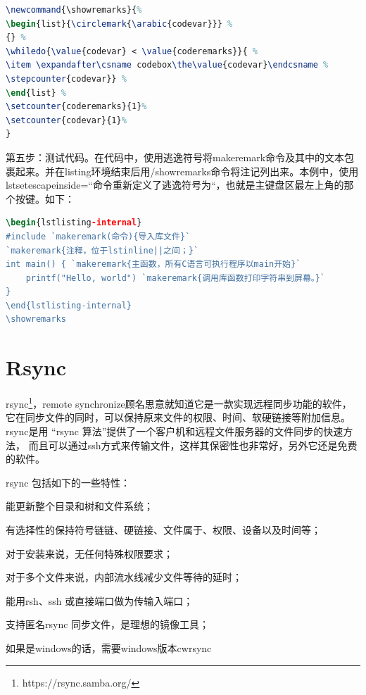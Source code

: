 \documentclass{book}
\newcounter{coderemarks}   %
\newcounter{codevar}     %
\newcommand{\circlemark}[1]{%
\tikz\node[text=white,font=\sffamily\bfseries,inner sep=0.2mm,draw,circle,fill=black]{#1};}
\newcommand{\showremarks}{%
\begin{list}{\circlemark{\arabic{codevar}}} %
{} %
\whiledo{\value{codevar} < \value{coderemarks}}{ %
\item \expandafter\csname codebox\the\value{codevar}\endcsname %
\stepcounter{codevar}} %
\end{list} %
\setcounter{coderemarks}{1}%
\setcounter{codevar}{1}%
}
\begin{document}
\begin{lstlisting}[language=TeX]
\newcommand{\showremarks}{%
\begin{list}{\circlemark{\arabic{codevar}}} %
{} %
\whiledo{\value{codevar} < \value{coderemarks}}{ %
\item \expandafter\csname codebox\the\value{codevar}\endcsname %
\stepcounter{codevar}} %
\end{list} %
\setcounter{coderemarks}{1}%
\setcounter{codevar}{1}%
}
\end{lstlisting}

第五步：测试代码。在代码中，使用逃逸符号将makeremark命令及其中的文本包裹起来。并在listing环境结束后用/showremarks命令将注记列出来。本例中，使用lstset{escapeinside=``}命令重新定义了逃逸符号为``，也就是主键盘区最左上角的那个按键。如下：

\begin{lstlisting}[language=TeX]
\begin{lstlisting-internal}
#include `makeremark(命令){导入库文件}`
`makeremark{注释，位于lstinline||之间；}`
int main() { `makeremark{主函数，所有C语言可执行程序以main开始}`
    printf("Hello, world") `makeremark{调用库函数打印字符串到屏幕。}`
}
\end{lstlisting-internal}
\showremarks
\end{lstlisting}

\section{Rsync}

rsync\footnote{https://rsync.samba.org/}，remote synchronize顾名思意就知道它是一款实现远程同步功能的软件，
它在同步文件的同时，可以保持原来文件的权限、时间、软硬链接等附加信息。 
rsync是用 “rsync 算法”提供了一个客户机和远程文件服务器的文件同步的快速方法，
而且可以通过ssh方式来传输文件，这样其保密性也非常好，另外它还是免费的软件。

rsync 包括如下的一些特性：

能更新整个目录和树和文件系统；

有选择性的保持符号链链、硬链接、文件属于、权限、设备以及时间等；

对于安装来说，无任何特殊权限要求；

对于多个文件来说，内部流水线减少文件等待的延时；

能用rsh、ssh 或直接端口做为传输入端口；

支持匿名rsync 同步文件，是理想的镜像工具；

如果是windows的话，需要windows版本cwrsync
\end{document}
